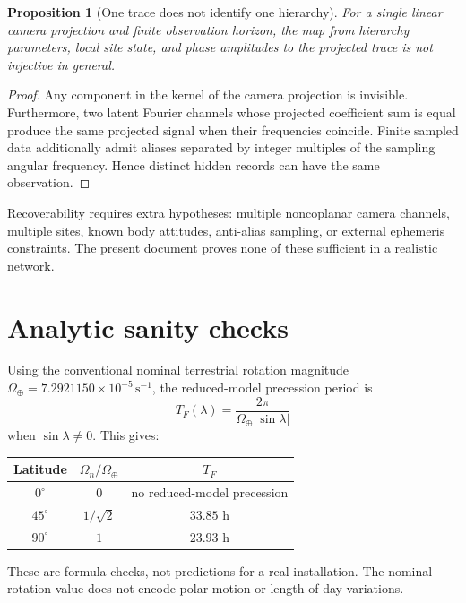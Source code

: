 \documentclass[11pt,a4paper]{article}
\theoremstyle{definition}
\theoremstyle{plain}
\newtheorem{proposition}[definition]{Proposition}
\theoremstyle{remark}
\begin{document}
\begin{proposition}[One trace does not identify one hierarchy]
For a single linear camera projection and finite observation horizon,
the map from hierarchy parameters, local site state, and phase
amplitudes to the projected trace is not injective in general.
\end{proposition}

\begin{proof}
Any component in the kernel of the camera projection is invisible.
Furthermore, two latent Fourier channels whose projected coefficient
sum is equal produce the same projected signal when their frequencies
coincide. Finite sampled data additionally admit aliases separated by
integer multiples of the sampling angular frequency. Hence distinct
hidden records can have the same observation.
\end{proof}

Recoverability requires extra hypotheses: multiple noncoplanar camera
channels, multiple sites, known body attitudes, anti-alias sampling,
or external ephemeris constraints. The present document proves none
of these sufficient in a realistic network.

\section{Analytic sanity checks}

Using the conventional nominal terrestrial rotation magnitude
\(\Omega_\oplus=7.2921150\times10^{-5}\,\mathrm{s}^{-1}\), the
reduced-model precession period is
\[
T_F(\lambda)=\frac{2\pi}{\Omega_\oplus\lvert\sin\lambda\rvert}
\]
when \(\sin\lambda\ne0\). This gives:

\begin{center}
\begin{tabular}{ccc}
\toprule
Latitude & \(\Omega_n/\Omega_\oplus\) & \(T_F\) \\
\midrule
\(0^\circ\) & \(0\) & no reduced-model precession \\
\(45^\circ\) & \(1/\sqrt2\) & \(33.85\) h \\
\(90^\circ\) & \(1\) & \(23.93\) h \\
\bottomrule
\end{tabular}
\end{center}

These are formula checks, not predictions for a real installation.
The nominal rotation value does not encode polar motion or
length-of-day variations.
\end{document}
